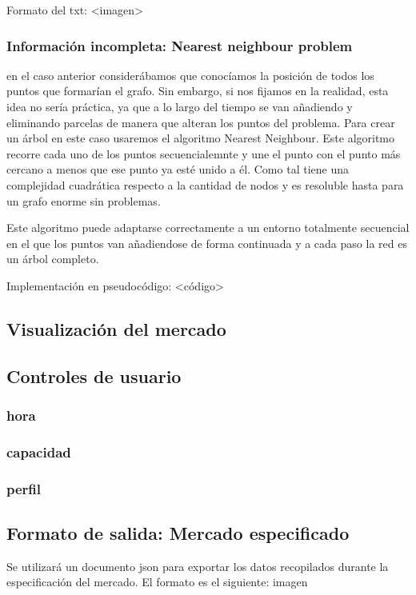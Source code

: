 \documentclass[12pt,a4paper,openright,oneside]{article}
\numberwithin{equation}{section}
\theoremstyle{definition}
\begin{document}
Formato del txt: <imagen>

\subsubsection{Información incompleta: Nearest neighbour problem}
en el caso anterior considerábamos que conocíamos la posición de todos los puntos que formarían el grafo. Sin embargo, si nos fijamos en la realidad, esta idea no sería práctica, ya que a lo largo del tiempo se van añadiendo y eliminando parcelas de manera que alteran los puntos del problema. Para crear un árbol en este caso usaremos el algoritmo Nearest Neighbour. Este algoritmo recorre cada uno de los puntos secuencialemnte y une el punto con el punto más cercano a menos que ese punto ya esté unido a él. Como tal tiene una complejidad cuadrática respecto a la cantidad de nodos y es resoluble hasta para un grafo enorme sin problemas.

Este algoritmo puede adaptarse correctamente a un entorno totalmente secuencial en el que los puntos van añadiendose de forma continuada y a cada paso la red es un árbol completo.

Implementación en pseudocódigo: <código>

\subsection{Visualización del mercado}

\subsection{Controles de usuario}
\subsubsection{hora}
\subsubsection{capacidad}
\subsubsection{perfil}


\subsection{Formato de salida: Mercado especificado}
Se utilizará un documento json para exportar los datos recopilados durante la especificación del mercado. El formato es el siguiente:
imagen
\end{document}

